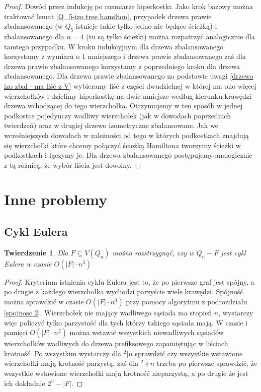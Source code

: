 \documentclass{pracamgr}
\newtheorem{theorem}{Twierdzenie}
\begin{document}
     \begin{proof}
      Dowód przez indukcję po rozmiarze hiperkostki. Jako krok bazowy można traktować lemat \ref{Q_5-izo tree hamilton}, przypadek drzewa prawie zbalansowanego
      (w $Q_5$ istnieje takie tylko jedno nie będące ścieżką) i zbalansowanego dla $n=4$ (tu są tylko ścieżki) można rozpatrzyć analogicznie dla tamtego przypadku.
      W kroku indukcyjnym dla drzewa zbalansowanego korzystamy z wymiaru o $1$ mniejszego i drzewa prawie zbalansowanego 
      zaś dla drzewa prawie zbalansowanego korzystamy z poprzedniego kroku dla drzewa zbalansowanego.
      Dla drzewa prawie zbalansowanego na podstawie uwagi \ref{drzewo izo zbal - ma liść z V} wybieramy liść
      z części dwudzielnej w której ma ono więcej wierzchołków i dzielimy hiperkostkę na dwie mniejsze według kierunku krawędzi drzewa
      wchodzącej do tego wierzchołka. Otrzymujemy w ten sposób w jednej podkostce pojedynczy wadliwy wierzchołek (jak w dowodach poprzednich twierdzeń)
      oraz w drugiej drzewo izometryczne zbalansowane. Jak we wcześniejszych dowodach w zależności od tego w których podkostkach znajdują się wierzchołki
      które chcemy połączyć ścieżką Hamiltona tworzymy ścieżki w podkostkach i łączymy je. Dla drzewa zbalansowanego postępujemy analogicznie z tą różnicą,
      że wybór liścia jest dowolny.
     \end{proof}
  \section{Inne problemy}
   \subsection{Cykl Eulera}
    \begin{theorem}\label{cykl Eulera}
     Dla $F\subseteq V(Q_n)$ można rozstrzygnąć, czy w $Q_n-F$ jest cykl Eulera w czasie $O(|F|\cdot n^3)$
    \end{theorem}
    \begin{proof}
     Kryterium istnienia cyklu Eulera jest to, że po pierwsze graf jest spójny, a po drugie z każdego wierzchołka wychodzi parzyście wiele krawędzi.
     Spójność można sprawdzić w czasie $O(|F|\cdot n^3)$ przy pomocy algorytmu z podrozdziału \ref{spojnosc 2}.
     Wierzchołek nie mający wadliwego sąsiada ma stopień $n$, wystarczy więc policzyć tylko parzystość dla tych którzy takiego sąsiada mają.
     W czasie i pamięci $O(|F|\cdot n^2)$ można wstawić wszystkich niewadliwych sąsiadów wierzchołków wadliwych
     do drzewa prefiksowego zapamiętując w liściach krotność.
     Po wszystkim wystarczy dla $^2|n$ sprawdzić czy wszystkie wstawione wierzchołki mają krotność parzystą, zaś dla $^2\nmid n$ trzeba po pierwsze sprawdzić,
     że wszystkie wstawione wierzchołki mają krotność nieparzystą, a po drugie że jest ich dokładnie $2^n-|F|$.
    \end{proof}
\end{document}
